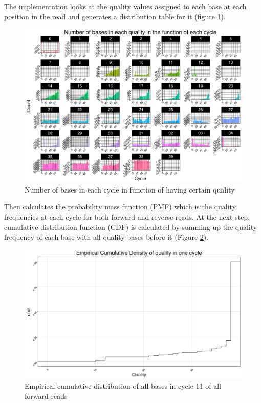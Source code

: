 \documentclass[11pt,a4paper]{report}
\begin{document}
The implementation looks at the quality values assigned to each base at each
position in the read and generates a distribution table for it (figure \ref{hist}).

\begin{figure}[H]
\centering
\includegraphics[width=12cm]{pictures/Rplot_quality.pdf}
\caption{Number of bases in each cycle in function of having certain quality}
\label{hist}
\end{figure}

Then calculates the probability mass function (PMF) which is the quality 
frequencies at each cycle for both forward and reverse reads. At the next 
step, cumulative distribution function (CDF) is calculated by summing up the 
quality frequency of each base with all quality bases before it (Figure \ref{CDF}).

\begin{figure}[H]
\centering
\includegraphics[width=12cm]{pictures/Rplot_ecdf.png}
\caption{Empirical cumulative distribution of all bases in cycle 11 of all forward 
reads}
\label{CDF}
\end{figure}
\end{document}
